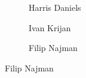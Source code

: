 \begin{frame}[plain]
\begin{figure}[h]
\begin{subfigure}{0.23\textwidth}
	\caption{\scriptsize Harris Daniels}
	\end{subfigure}
	\begin{subfigure}{0.23\textwidth}
	\captionsetup{labelformat=empty}
	\centering
	\caption{\scriptsize Ivan Krijan}
	\end{subfigure}
	\begin{subfigure}{0.23\textwidth}
	\captionsetup{labelformat=empty}
	\centering
	\caption{\scriptsize Filip Najman}
	\end{subfigure}
	\end{figure}
\end{frame}





